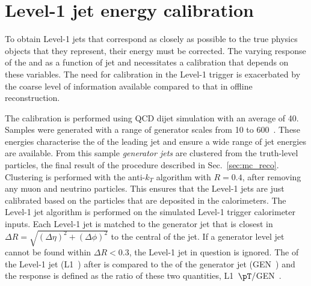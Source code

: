 \section{Level-1 jet energy calibration}
\label{sec:l1jec}

To obtain Level-1 jets that correspond as closely as possible to the
true physics objects that they represent, their energy must be
corrected. The
varying response of the \HCAL and \ECAL as a function of jet \pT and
\eta necessitates a calibration that depends on these variables.  The
need for calibration in the Level-1 trigger is exacerbated by the
coarse level of information available compared to that in offline
reconstruction.

The calibration is performed using QCD dijet \MC simulation with an
average \PU of 40. Samples were generated with a range of generator
scales from 10 to 600~\gev. These energies characterise the \pT of the
leading jet and ensure a wide range of jet energies are available. From this sample \emph{generator jets} are clustered from
the truth-level particles, the final result of the procedure
described in Sec.~\ref{sec:mc_reco}. Clustering is performed with the
anti-$k_T$ algorithm with $R=0.4$, after removing any muon and
neutrino particles. This ensures that the Level-1 jets are just
calibrated based on the particles that are deposited in the
calorimeters. The Level-1 jet algorithm is performed on the simulated
Level-1
trigger calorimeter inputs. Each Level-1 jet is matched to the
generator jet that is closest in $\Delta
R=\sqrt{(\Delta\eta)^2+(\Delta\phi)^2}$ to the central \TT of the jet.
If a generator level jet cannot be found within $\Delta R<0.3$, the
Level-1 jet in question is ignored. The \pT of the Level-1 jet
(L1~\pT) after \PUS is compared to the \pT of the generator jet
(GEN~\pT) and the response is defined as the ratio of these two
quantities, L1~$\pT/$GEN~\pT.

